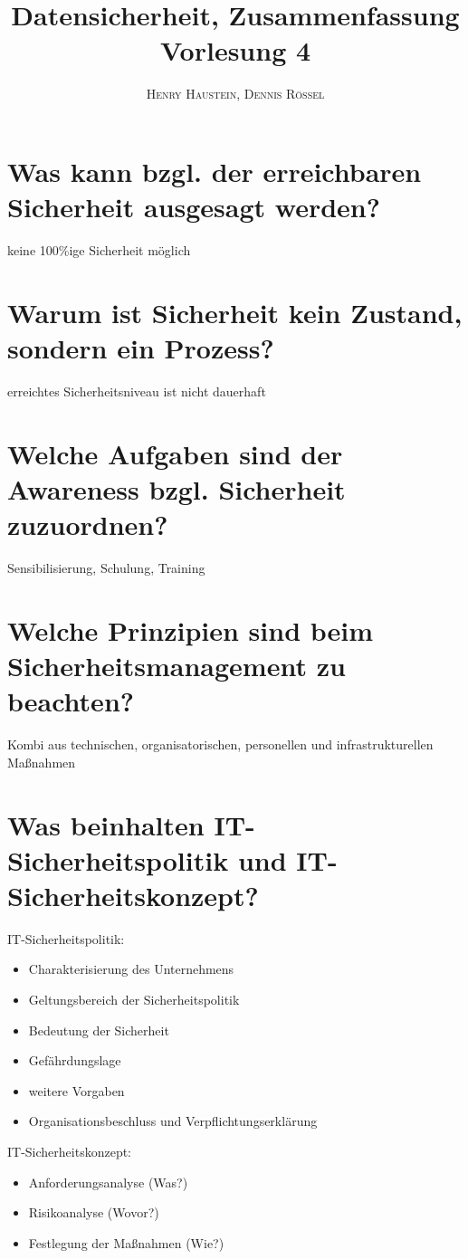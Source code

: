 \documentclass{article}
\title{\textbf{Datensicherheit, Zusammenfassung Vorlesung 4}}
\author{\textsc{Henry Haustein}, \textsc{Dennis Rössel}}
\date{}
\begin{document}
	\maketitle
	
	\section*{Was kann bzgl. der erreichbaren Sicherheit ausgesagt werden?}
	keine 100\%ige Sicherheit möglich
	
	\section*{Warum ist Sicherheit kein Zustand, sondern ein Prozess?}
	erreichtes Sicherheitsniveau ist nicht dauerhaft
	
	\section*{Welche Aufgaben sind der Awareness bzgl. Sicherheit zuzuordnen?}
	Sensibilisierung, Schulung, Training
	
	\section*{Welche Prinzipien sind beim Sicherheitsmanagement zu beachten?}
	Kombi aus technischen, organisatorischen, personellen und infrastrukturellen Maßnahmen
	
	\section*{Was beinhalten IT-Sicherheitspolitik und IT-Sicherheitskonzept?}
	IT-Sicherheitspolitik:
	\begin{itemize}
		\item Charakterisierung des Unternehmens
		\item Geltungsbereich der Sicherheitspolitik
		\item Bedeutung der Sicherheit
		\item Gefährdungslage
		\item weitere Vorgaben
		\item Organisationsbeschluss und Verpflichtungserklärung
	\end{itemize}

	IT-Sicherheitskonzept:
	\begin{itemize}
		\item Anforderungsanalyse (Was?)
		\item Risikoanalyse (Wovor?)
		\item Festlegung der Maßnahmen (Wie?)
	\end{itemize}
	
\end{document}
